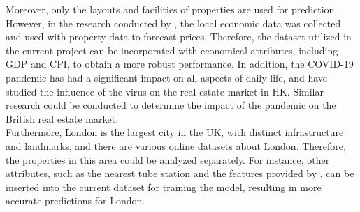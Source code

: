 \documentclass[12pt,twoside]{report}
\begin{document}
Moreover, only the layouts and facilities of properties are used for prediction. However, in the research conducted by \citet{RN20}, the local economic data was collected and used with property data to forecast prices. Therefore, the dataset utilized in the current project can be incorporated with economical attributes, including GDP and CPI, to obtain a more robust performance. In addition, the COVID-19 pandemic has had a significant impact on all aspects of daily life, and \citet{RN24} have studied the influence of the virus on the real estate market in HK. Similar research could be conducted to determine the impact of the pandemic on the British real estate market. 
\\

Furthermore, London is the largest city in the UK, with distinct infrastructure and landmarks, and there are various online datasets about London. Therefore, the properties in this area could be analyzed separately. For instance, other attributes, such as the nearest tube station and the features provided by \citet{RN26}, can be inserted into the current dataset for training the model, resulting in more accurate predictions for London. 
\end{document}
